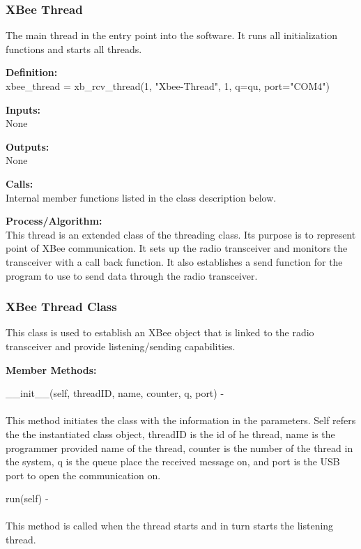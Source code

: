 \documentclass[10pt,draftclsnofoot,onecolumn,compsoc]{IEEEtran}
\begin{document}
\subsubsection{XBee Thread}
The main thread in the entry point into the software. It runs all initialization functions and starts all threads. \par
{\bf Definition:} \\ 
xbee\_thread = xb\_rcv\_thread(1, "Xbee-Thread", 1, q=qu, port="COM4")  \par
{\bf Inputs:} \\  None \par
{\bf Outputs:} \\ None \par
{\bf Calls:} \\ Internal member functions listed in the class description below. \par
{\bf Process/Algorithm:} \\
This thread is an extended class of the threading class. Its purpose is to represent point of XBee communication. It sets up the radio transceiver and monitors the transceiver with a call back function. It also establishes a send function for the program to use to send data through the radio transceiver.  \par

\subsubsection{XBee Thread Class}
This class is used to establish an XBee object that is linked to the radio transceiver and provide listening/sending capabilities. \par

{\bf Member Methods:} \par

 \_\_init\_\_(self, threadID, name, counter, q, port) - \\ \\
This method initiates the class with the information in the parameters. Self refers the the instantiated class object, threadID is the id of he thread, name is the programmer provided name of the thread, counter is the number of the thread in the system, q is the queue place the received message on, and port is the USB port to open the communication on. \par

run(self) - \\ \\
This method is called when the thread starts and in turn starts the listening thread. \par
\end{document}
